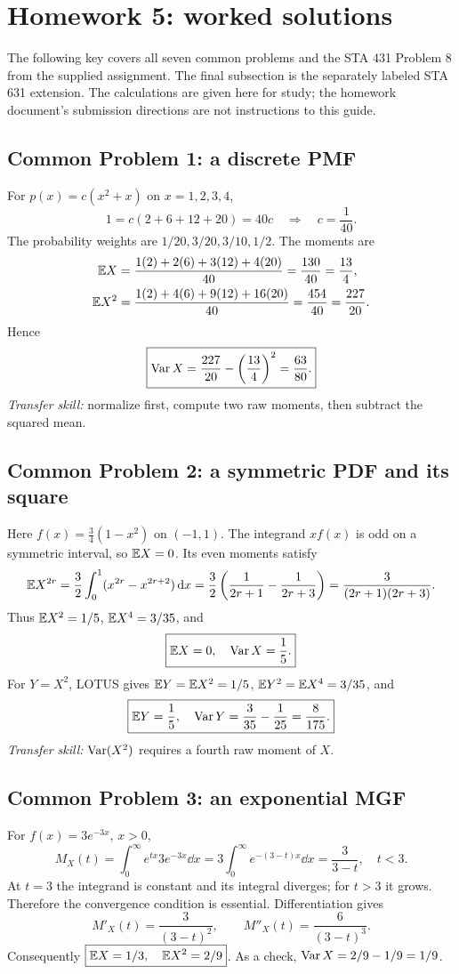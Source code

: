 \section{Homework 5: worked solutions}
\label{sec:hw5}
The following key covers all seven common problems and the STA 431 Problem 8 from the supplied assignment. The final subsection is the separately labeled STA 631 extension. The calculations are given here for study; the homework document's submission directions are not instructions to this guide.

\subsection{Common Problem 1: a discrete PMF}
For $p(x)=c(x^2+x)$ on $x=1,2,3,4$,
\[
1=c(2+6+12+20)=40c\quad\Longrightarrow\quad c=\frac1{40}.
\]
The probability weights are $1/20,3/20,3/10,1/2$. The moments are
\begin{align*}
\mathbb E X&=\frac{1(2)+2(6)+3(12)+4(20)}{40}=\frac{130}{40}=\frac{13}{4},\\
\mathbb E X^2&=\frac{1(2)+4(6)+9(12)+16(20)}{40}=\frac{454}{40}=\frac{227}{20}.
\end{align*}
Hence
\[
\boxed{\operatorname{Var} X=\frac{227}{20}-\left(\frac{13}{4}\right)^2=\frac{63}{80}.}
\]
\textit{Transfer skill:} normalize first, compute two raw moments, then subtract the squared mean.

\subsection{Common Problem 2: a symmetric PDF and its square}
Here $f(x)=\frac34(1-x^2)$ on $(-1,1)$. The integrand $xf(x)$ is odd on a symmetric interval, so $\mathbb E X=0$. Its even moments satisfy
\[
\mathbb E X^{2r}=\frac32\int_0^1(x^{2r}-x^{2r+2})\,\mathrm d x
=\frac32\left(\frac1{2r+1}-\frac1{2r+3}\right)
=\frac3{(2r+1)(2r+3)}.
\]
Thus $\mathbb E X^2=1/5$, $\mathbb E X^4=3/35$, and
\[
\boxed{\mathbb E X=0,\quad\operatorname{Var} X=\frac15.}
\]
For $Y=X^2$, LOTUS gives $\mathbb E Y=\mathbb E X^2=1/5$, $\mathbb E Y^2=\mathbb E X^4=3/35$, and
\[
\boxed{\mathbb E Y=\frac15,\quad\operatorname{Var} Y=\frac3{35}-\frac1{25}=\frac8{175}.}
\]
\textit{Transfer skill:} $\operatorname{Var}(X^2)$ requires a fourth raw moment of $X$.

\subsection{Common Problem 3: an exponential MGF}
For $f(x)=3e^{-3x}$, $x>0$,
\[
M_X(t)=\int_0^\infty e^{tx}3e^{-3x}\dd x
=3\int_0^\infty e^{-(3-t)x}\dd x
=\boxed{\frac3{3-t},\quad t<3.}
\]
At $t=3$ the integrand is constant and its integral diverges; for $t>3$ it grows. Therefore the convergence condition is essential. Differentiation gives
\[
M'_X(t)=\frac3{(3-t)^2},\qquad M''_X(t)=\frac6{(3-t)^3}.
\]
Consequently $\boxed{\mathbb E X=1/3,\quad\mathbb E X^2=2/9}$. As a check, $\operatorname{Var} X=2/9-1/9=1/9$.

